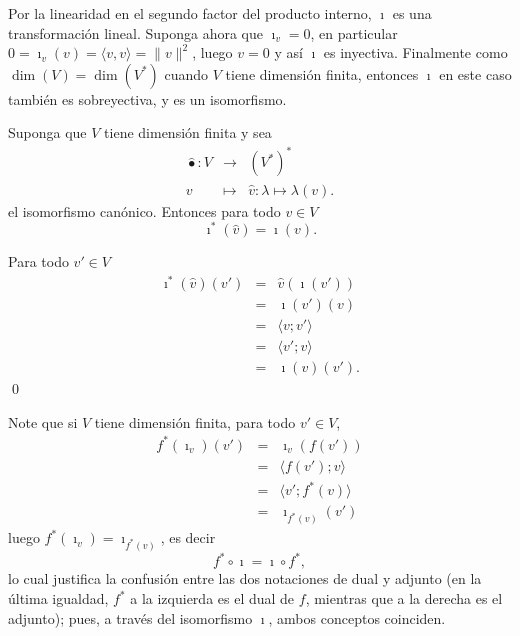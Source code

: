 \dem Por la linearidad en el segundo factor del producto interno, $\imath$ es una transformaci\'on lineal. Suponga ahora que $\imath_v=0$, en particular $0=\imath_v(v)=\langle v,v \rangle=\|v\|^2$, luego $v=0$ y as\'i $\imath$ es inyectiva. Finalmente como $\dim(V)=\dim(V^*)$ cuando $V$ tiene dimensi\'on finita, entonces $\imath$ en este caso tambi\'en es sobreyectiva, y es un isomorfismo.

\begin{prop}
Suponga que $V$ tiene dimensi\'on finita y sea
\begin{eqnarray*}
\widehat{\bullet}: V & \longrightarrow & \left(V^*\right)^*\\
                            v &\longmapsto &\widehat{v}:\lambda\mapsto\lambda(v).
\end{eqnarray*}
el isomorfismo can\'onico. Entonces para todo $v\in V$
\[
\imath^*(\widehat{v})=\imath(v).
\]
\end{prop}

\dem Para todo $v'\in V$
\begin{eqnarray*}
\imath^*(\widehat{v})(v')  & = & \widehat{v}(\imath(v'))\\
  & = & \imath(v')(v)\\
  & = & \langle v;v'\rangle\\
  & = & \langle v';v\rangle\\
  & = & \imath(v)(v').
\end{eqnarray*}
\qed

\begin{obs}
Note que si $V$ tiene dimensi\'on finita, para todo $v'\in V$,
\begin{eqnarray*}
f^*(\imath_v)(v') & = & \imath_v\left(f(v')\right)\\
   & = & \langle f(v');v \rangle\\
   & = & \langle v';f^*(v)\rangle\\
   & = & \imath_{f^*(v)}(v')
\end{eqnarray*}
luego $f^*(\imath_v)=\imath_{f^*(v)}$, es decir
\[
f^*\circ \imath=\imath \circ f^*,
\]
lo cual justifica la confusi\'on entre las dos notaciones de dual y adjunto (en la \'ultima igualdad, $f^*$ a la izquierda es el dual de $f$, mientras que a la derecha es el adjunto); pues, a trav\'es del isomorfismo $\imath$, ambos conceptos coinciden.
\end{obs}

